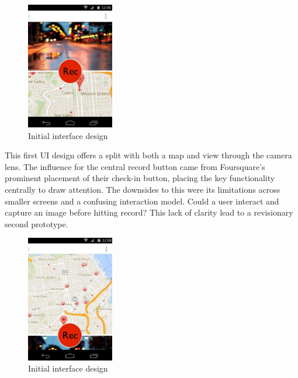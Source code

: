 \documentclass{l3proj}
\begin{document}
\begin{figure}
\begin{center}
  \includegraphics[width=0.34\textwidth]{images/android-digital-prototype-1.jpg}
\end{center}
\caption{Initial interface design}
\end{figure}

This first UI design offers a split with both a map and view through the camera
lens. The influence for the central record button came from Foursquare’s
prominent placement of their check-in button, placing the key functionality
centrally to draw attention. The downsides to this were its limitations across
smaller screens and a confusing interaction model. Could a user interact and
capture an image before hitting record? This lack of clarity lead to a
revisionary second prototype.

\begin{figure}
\begin{center}
  \includegraphics[width=0.34\textwidth]{images/android-digital-prototype-2.jpg}
\end{center}
\caption{Initial interface design}
\end{figure}
\end{document}
